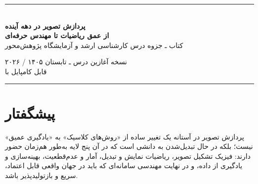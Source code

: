 \documentclass[12pt,openany,oneside]{book}
\begin{document}
\begin{titlepage}
\centering
\vspace*{1.2cm}
{\color{DeepBlue}\rule{0.88\textwidth}{1.1pt}}\\[1.2cm]
{\Huge\bfseries پردازش تصویر در دهه آینده\\[0.35cm]}
{\LARGE\bfseries از عمق ریاضیات تا مهندس حرفه‌ای\\[0.9cm]}
{\Large کتاب ـ جزوه درس کارشناسی ارشد و آزمایشگاه پژوهش‌محور\\[1.3cm]}


\vfill
{\large نسخه آغازین درس ـ تابستان ۱۴۰۵ / ۲۰۲۶}\\[0.4cm]
{\normalsize قابل کامپایل با }\\[0.8cm]
{\color{DeepBlue}\rule{0.88\textwidth}{1.1pt}}
\end{titlepage}

\frontmatter

\chapter*{پیشگفتار}

پردازش تصویر در آستانه یک تغییر ساده از «روش‌های کلاسیک» به «یادگیری عمیق» نیست؛
بلکه در حال تبدیل‌شدن به دانشی است که در آن پنج لایه به‌طور هم‌زمان حضور دارند:
فیزیک تشکیل تصویر، ریاضیات نمایش و تبدیل، آمار و عدم‌قطعیت، بهینه‌سازی و یادگیری از داده،
و در نهایت مهندسی سامانه‌ای که باید در جهان واقعی قابل اعتماد، سریع و بازتولیدپذیر باشد.
\end{document}
